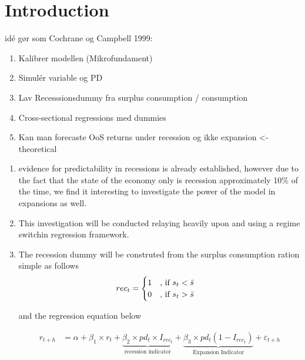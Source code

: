 \section{Introduction} \label{sec:Introduction}

idé gør som Cochrane og Campbell 1999:
\begin{enumerate}
    \item Kalibrer modellen (Mikrofundament)
    \item Simulér variable og PD
    \item Lav Recesssionsdummy fra surplus consumption / consumption
    \item Cross-sectional regressions med dummies
    \item Kan man forecaste OoS returns under recession og ikke expansion <- theoretical
\end{enumerate}

\hline

\begin{enumerate}
    \item evidence for predictability in recessions is already established, however due to the fact that the state of the economy only is recession approximately 10\% of the time, we find it interesting to investigate the power of the model in expansions as well. 
    \item This investigation will be conducted relaying heavily upon \cite{Campbell1999} and using a regime switchin regression framework. 
    \item The recession dummy will be construted from the surplus consumption ration simple as follows
    \begin{align}
        rec_t & = \begin{cases} 1 & \text{, if } s_t < \Bar{s} \\
                              0 & \text{, if } s_t > \Bar{s} \end{cases}
    \end{align}
    
    and the regression equation below
    
    \begin{align}
        r_{t+h} & = \alpha + \beta_1 \times r_t + \underbrace{\beta_2 \times pd_t  \times I_{rec_t}}_{\text{recession indicator}} + \underbrace{\beta_3 \times pd_t \left(1 - I_{rec_t} \right)}_{\text{Expansion Indicator}} + \varepsilon_{t+h} 
    \end{align}
    

\end{enumerate}




